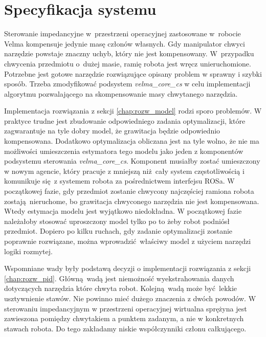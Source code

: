 
\chapter{Specyfikacja systemu \label{chap:specyfikacja_systemu}}
Sterowanie impedancyjne w~przestrzeni operacyjnej zastosowane w~robocie Velma kompensuje jedynie masę członów własnych. Gdy manipulator chwyci narzędzie powstaje znaczny uchyb, który nie jest kompensowany. W~przypadku chwycenia przedmiotu o~dużej masie, ramię robota jest wręcz unieruchomione. Potrzebne jest gotowe narzędzie rozwiązujące opisany problem w sprawny i szybki sposób. Trzeba zmodyfikować podsystem \textit{velma\_core\_cs} w celu implementacji algorytmu pozwalającego na skompensowanie masy chwytanego narzędzia. 

Implementacja rozwiązania z sekcji \ref{chap:rozw_model} rodzi sporo problemów. W praktyce trudne jest zbudowanie odpowiedniego zadania optymalizacji, które zagwarantuje na tyle dobry model, że grawitacja będzie odpowiednio kompensowana. Dodatkowo optymalizacja obliczana jest na tyle wolno, że nie ma możliwości umieszczenia estymatora tego modelu jako jeden z komponentów podsystemu sterowania \textit{velma\_core\_cs}. Komponent musiałby zostać umieszczony w nowym agencie, który pracuje z mniejszą niż cały system częstotliwością i komunikuje się z systemem robota za pośrednictwem interfejsu ROSa. W początkowej fazie, gdy przedmiot zostanie chwycony najczęściej ramiona robota zostają nieruchome, bo grawitacja chwyconego narzędzia nie jest kompensowana. Wtedy estymacja modelu jest wyjątkowo niedokładna. W początkowej fazie należałoby stosować uproszczony model tylko po to żeby robot podniósł przedmiot. Dopiero po kilku ruchach, gdy zadanie optymalizacji zostanie poprawnie rozwiązane, można wprowadzić właściwy model z użyciem narzędzi logiki rozmytej.

Wspomniane wady były podstawą decyzji o implementacji rozwiązania z sekcji \ref{chap:rozw_pid}. Główną wadą jest niemożność wyekstrahowania danych dotyczących narzędzia które chwyta robot. Kolejną wadą może być lekkie usztywnienie stawów. Nie powinno mieć dużego znaczenia z dwóch powodów. W sterowaniu impedancyjnym w przestrzeni operacyjnej wirtualna sprężyna jest zawieszona pomiędzy chwytakiem a punktem zadanym, a nie w konkretnych stawach robota. Do tego zakładamy niskie współczynniki członu całkującego.


